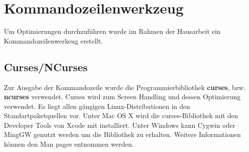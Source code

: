 \section{Kommandozeilenwerkzeug}
Um Optimierungen durchzuführen wurde im Rahmen der Hausarbeit ein Kommandozeilenwerkeug erstellt.

\subsection{Curses/NCurses}

Zur Ausgabe der Kommandozeile wurde die Programmierbibliothek \textbf{curses}, bzw. \textbf{ncurses} verwendet. Curses wird zum Screen Handling und dessen Optimierung verwendet. Es liegt allen gängigen Linux-Distributionen in den Standartpaketquellen vor. Unter Mac OS X wird die curses-Bibliothek mit den Developer Tools von Xcode mit installiert. Unter Windows kann Cygwin oder MingGW genutzt werden um die Bibliothek zu erhalten. Weitere Informationen können den Man pages entnommen werden.
